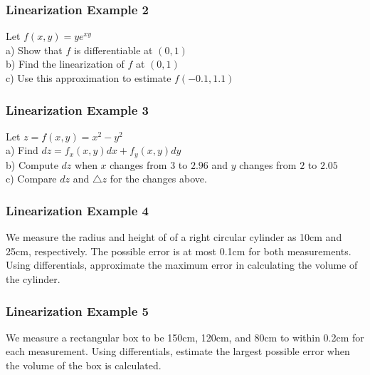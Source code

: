 \documentclass[12pt]{article}
\begin{document}
\subsubsection{Linearization Example 2}
Let \(f(x,y) = ye^{xy}\) \\
a) Show that \(f\) is differentiable at \((0,1)\) \\
b) Find the linearization of \(f\) at \((0,1)\) \\
c) Use this approximation to estimate \(f(-0.1,1.1)\) 

\subsubsection{Linearization Example 3}
Let \(z=f(x,y)=x^2-y^2\) \\
a) Find \(dz=f_x(x,y)dx+f_y(x,y)dy\)\\
b) Compute \(dz\) when \(x\) changes from \(3\) to \(2.96\) and \(y\) changes from \(2\) to \(2.05\) \\
c) Compare \(dz\) and \(\triangle z\) for the changes above.

\subsubsection{Linearization Example 4}
We measure the radius and height of of a right circular cylinder as 10cm and 25cm, respectively.
The possible error is at most 0.1cm for both measurements. Using differentials, approximate the maximum error in calculating the volume of the cylinder.

\subsubsection{Linearization Example 5}
We measure a rectangular box to be 150cm, 120cm, and 80cm to within 0.2cm for each measurement. Using differentials, estimate the largest possible error when the volume of the box is calculated.
\end{document}
